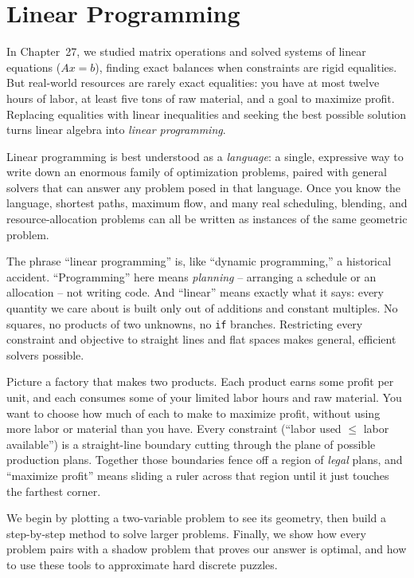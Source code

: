 \chapter{Linear Programming}
\label{ch28:lp}

In Chapter~27, we studied matrix operations and solved systems of linear equations ($Ax = b$), finding exact balances when constraints are rigid equalities. But real-world resources are rarely exact equalities: you have at most twelve hours of labor, at least five tons of raw material, and a goal to maximize profit. Replacing equalities with linear inequalities and seeking the best possible solution turns linear algebra into \emph{linear programming}.

Linear programming is best understood as a \emph{language}: a single, expressive way to write down an enormous family of optimization problems, paired with general solvers that can answer any problem posed in that language. Once you know the language, shortest paths, maximum flow, and many real scheduling, blending, and resource-allocation problems can all be written as instances of the same geometric problem.

The phrase ``linear programming'' is, like ``dynamic programming,'' a
historical accident. ``Programming'' here means \emph{planning} -- arranging a
schedule or an allocation -- not writing code. And ``linear'' means exactly
what it says: every quantity we care about is built only out of additions and
constant multiples. No squares, no products of two unknowns, no \texttt{if}
branches. Restricting every constraint and objective to straight lines and flat spaces makes general, efficient solvers possible.

\begin{intuitionbox}
Picture a factory that makes two products. Each product earns some profit per
unit, and each consumes some of your limited labor hours and raw material. You
want to choose how much of each to make to maximize profit, without using more
labor or material than you have. Every constraint (``labor used $\le$ labor
available'') is a straight-line boundary cutting through the plane of possible
production plans. Together those boundaries fence off a region of \emph{legal}
plans, and ``maximize profit'' means sliding a ruler across that region until
it just touches the farthest corner.
\end{intuitionbox}

We begin by plotting a two-variable problem to see its geometry, then build a step-by-step method to solve larger problems. Finally, we show how every problem pairs with a shadow problem that proves our answer is optimal, and how to use these tools to approximate hard discrete puzzles.

